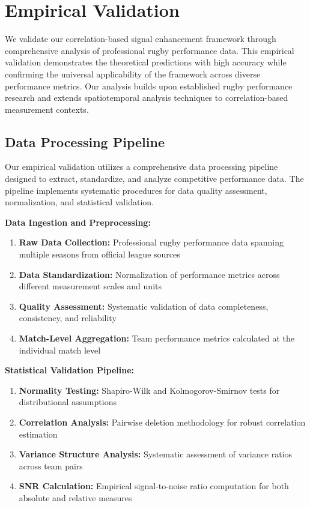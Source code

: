\section{Empirical Validation}

We validate our correlation-based signal enhancement framework through comprehensive analysis of professional rugby performance data. This empirical validation demonstrates the theoretical predictions with high accuracy while confirming the universal applicability of the framework across diverse performance metrics. Our analysis builds upon established rugby performance research \cite{bennett2019descriptive, scott2023performance, bennett2021predicting} and extends spatiotemporal analysis techniques \cite{bornn2021spatiotemporal} to correlation-based measurement contexts.

\subsection{Data Processing Pipeline}

Our empirical validation utilizes a comprehensive data processing pipeline designed to extract, standardize, and analyze competitive performance data. The pipeline implements systematic procedures for data quality assessment, normalization, and statistical validation.

\textbf{Data Ingestion and Preprocessing:}
\begin{enumerate}
    \item \textbf{Raw Data Collection:} Professional rugby performance data spanning multiple seasons from official league sources
    \item \textbf{Data Standardization:} Normalization of performance metrics across different measurement scales and units
    \item \textbf{Quality Assessment:} Systematic validation of data completeness, consistency, and reliability
    \item \textbf{Match-Level Aggregation:} Team performance metrics calculated at the individual match level
\end{enumerate}

\textbf{Statistical Validation Pipeline:}
\begin{enumerate}
    \item \textbf{Normality Testing:} Shapiro-Wilk and Kolmogorov-Smirnov tests for distributional assumptions
    \item \textbf{Correlation Analysis:} Pairwise deletion methodology for robust correlation estimation
    \item \textbf{Variance Structure Analysis:} Systematic assessment of variance ratios across team pairs
    \item \textbf{SNR Calculation:} Empirical signal-to-noise ratio computation for both absolute and relative measures
\end{enumerate}

